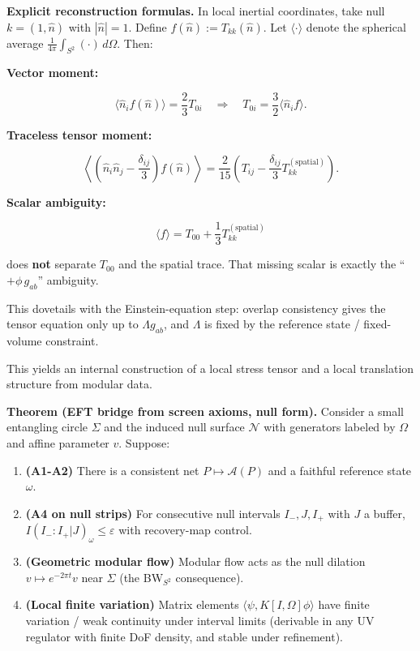 \documentclass[11pt,a4paper]{article}
\theoremstyle{remark}
\providecommand{\tightlist}{%
  \setlength{\itemsep}{0pt}\setlength{\parskip}{0pt}}
\begin{document}
\textbf{Explicit reconstruction formulas.} In local inertial coordinates, take
null \(k = (1, \hat{n})\) with \(|\hat{n}| = 1\). Define \(f(\hat{n}) := T_{kk}(\hat{n})\).
Let \(\langle \cdot \rangle\) denote the spherical average
\(\frac{1}{4\pi} \int_{S^2} (\cdot) \, d\Omega\). Then:

\textbf{Vector moment:}

\[
\langle \hat{n}_i f(\hat{n}) \rangle = \frac{2}{3} T_{0i}
\quad \Rightarrow \quad
T_{0i} = \frac{3}{2} \langle \hat{n}_i f \rangle.
\]

\textbf{Traceless tensor moment:}

\[
\left\langle \left(\hat{n}_i \hat{n}_j - \frac{\delta_{ij}}{3}\right) f(\hat{n}) \right\rangle
= \frac{2}{15} \left(T_{ij} - \frac{\delta_{ij}}{3} T_{kk}^{\mathrm{(spatial)}}\right).
\]

\textbf{Scalar ambiguity:}

\[
\langle f \rangle = T_{00} + \frac{1}{3} T_{kk}^{\mathrm{(spatial)}}
\]

does \textbf{not} separate \(T_{00}\) and the spatial trace. That missing scalar
is exactly the ``\(+ \phi \, g_{ab}\)'' ambiguity.

This dovetails with the Einstein-equation step: overlap consistency gives
the tensor equation only up to \(\Lambda g_{ab}\), and \(\Lambda\) is fixed by
the reference state / fixed-volume constraint.

This yields an internal construction of a local stress tensor and a local
translation structure from modular data.

\textbf{Theorem (EFT bridge from screen axioms, null form).} Consider a small
entangling circle \(\Sigma\) and the induced null surface \(\mathcal{N}\) with
generators labeled by \(\Omega\) and affine parameter \(v\). Suppose:

\begin{enumerate}
\def\labelenumi{\arabic{enumi}.}
\tightlist
\item
  \textbf{(A1-A2)} There is a consistent net \(P \mapsto \mathcal{A}(P)\) and a
  faithful reference state \(\omega\).
\item
  \textbf{(A4 on null strips)} For consecutive null intervals \(I_-, J, I_+\)
  with \(J\) a buffer, \(I(I_-:I_+|J)_\omega \le \varepsilon\) with
  recovery-map control.
\item
  \textbf{(Geometric modular flow)} Modular flow acts as the null dilation
  \(v \mapsto e^{-2\pi t} v\) near \(\Sigma\) (the BW\(_{S^2}\) consequence).
\item
  \textbf{(Local finite variation)} Matrix elements
  \(\langle \psi, K[I,\Omega] \phi \rangle\) have finite variation / weak
  continuity under interval limits (derivable in any UV regulator with
  finite DoF density, and stable under refinement).
\end{enumerate}
\end{document}
